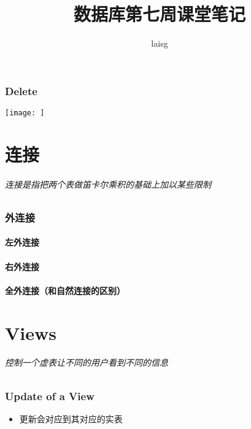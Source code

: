 \documentclass[UTF8]{article}
\title{数据库第七周课堂笔记}
\author{laisg}
\begin{document}
  \maketitle
  \section{Delete}%
  \label{sec:delete}

  \texttt{[image: ]} 

  \part{连接}%
  \label{prt:连接}
  \paragraph{连接是指把两个表做笛卡尔乘积的基础上加以某些限制}%
  \label{par:连接是指把两个表做笛卡尔乘积的基础上加以某些限制}

  \section{外连接}%
  \label{sec:外连接}
  
  \subsection{左外连接}%
  \label{sub:左外连接}
  
  \subsection{右外连接}%
  \label{sub:外连接}
  
  \subsection{全外连接（和自然连接的区别）}%
  \label{sub:连接}

  \part{Views}%
  \label{prt:views}
  \paragraph{控制一个虚表让不同的用户看到不同的信息}%
  \label{par:_控制一个虚表让不同的用户看到不同的信息}
  \section{Update of a View}%
  \label{sec:update_of_a_view}
  \begin{itemize}
    \item 更新会对应到其对应的实表
  \end{itemize}
  
\end{document}
